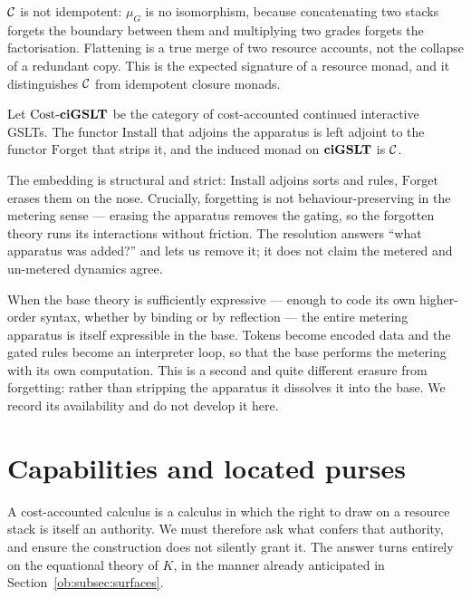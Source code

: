 \begin{remark}
$\mathcal{C}$ is not idempotent: $\mu_G$ is no isomorphism, because concatenating two stacks
forgets the boundary between them and multiplying two grades forgets the factorisation.
Flattening is a true merge of two resource accounts, not the collapse of a redundant
copy. This is the expected signature of a resource monad, and it distinguishes $\mathcal{C}$
from idempotent closure monads.
\end{remark}

\begin{proposition}
\label{ob:prop:cost-adjunction}
Let $\mathrm{Cost}\text{-}\mathbf{ciGSLT}$ be the category of cost-accounted continued
interactive GSLTs. The functor $\mathrm{Install}$ that adjoins the apparatus is left
adjoint to the functor $\mathrm{Forget}$ that strips it, and the induced monad on
$\mathbf{ciGSLT}$ is $\mathcal{C}$.
\end{proposition}

The embedding is structural and strict: $\mathrm{Install}$ adjoins sorts and rules,
$\mathrm{Forget}$ erases them on the nose. Crucially, forgetting is not
behaviour-preserving in the metering sense --- erasing the apparatus removes the gating,
so the forgotten theory runs its interactions without friction. The resolution answers
``what apparatus was added?'' and lets us remove it; it does not claim the metered and
un-metered dynamics agree.

\begin{remark}[Internalisation]
\label{ob:rem:internalise-cost}
When the base theory is sufficiently expressive --- enough to code its own higher-order
syntax, whether by binding or by reflection --- the entire metering apparatus is itself
expressible in the base. Tokens become encoded data and the gated rules become an
interpreter loop, so that the base performs the metering with its own computation. This
is a second and quite different erasure from forgetting: rather than stripping the
apparatus it dissolves it into the base. We record its availability and do not develop
it here.
\end{remark}

\section{Capabilities and located purses}
\label{ob:subsec:capabilities}

A cost-accounted calculus is a calculus in which the right to draw on a resource stack is
itself an authority. We must therefore ask what confers that authority, and ensure the
construction does not silently grant it. The answer turns entirely on the equational
theory of $K$, in the manner already anticipated in Section~\ref{ob:subsec:surfaces}.

